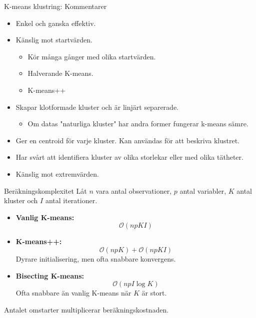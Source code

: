 \documentclass[10pt,english]{beamer}
\begin{document}
\begin{frame}{K-means klustring: Kommentarer}

    \begin{itemize}
        \item Enkel och ganska effektiv.
        \item Känslig mot startvärden.
        \begin{itemize}
            \item Kör många gånger med olika startvärden.
            \item Halverande K-means.
            \item K-means++
        \end{itemize}
        \item Skapar klotformade kluster och är linjärt separerade.
        \begin{itemize}
            \item Om datas "naturliga kluster" har andra former fungerar k-means sämre.
        \end{itemize}
        \item Ger en centroid för varje kluster. Kan användas för att beskriva klustret.
        \item Har svårt att identifiera kluster av olika storlekar eller med olika tätheter.
        \item Känslig mot extremvärden.
    \end{itemize}
    
\end{frame}


\begin{frame}{Beräkningskomplexitet}
    Låt $n$ vara antal observationer, $p$ antal variabler,
    $K$ antal kluster och $I$ antal iterationer.

    \begin{itemize}
        \item \textbf{Vanlig K-means:}
        \[
            \mathcal{O}(npKI)
        \]

        \item \textbf{K-means++:}
        \[
            \mathcal{O}(npK) + \mathcal{O}(npKI)
        \]
        Dyrare initialisering, men ofta snabbare konvergens.

        \item \textbf{Bisecting K-means:}
        \[
          \mathcal{O}(npI\log K)
        \]
        Ofta snabbare än vanlig K-means när $K$ är stort.
    \end{itemize}

    \begin{greenbox}
        Antalet omstarter multiplicerar beräkningskostnaden.
    \end{greenbox}
\end{frame}
\end{document}

